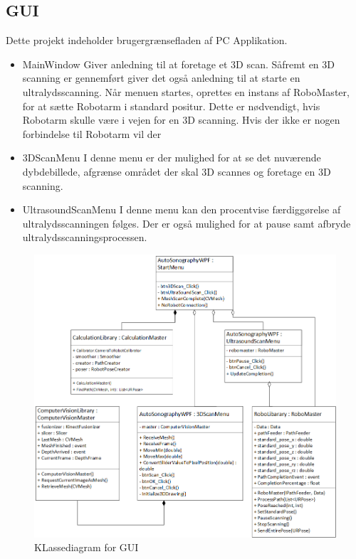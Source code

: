 \subsection{GUI}
Dette projekt indeholder brugergrænsefladen af PC Applikation.

\begin{itemize}
\item{MainWindow}
Giver anledning til at foretage et 3D scan. Såfremt en 3D scanning er gennemført giver det også anledning til at starte en ultralydsscanning.
Når menuen startes, oprettes en instans af RoboMaster, for at sætte Robotarm i standard positur. Dette er nødvendigt, hvis Robotarm skulle være i vejen for en 3D scanning.
Hvis der ikke er nogen forbindelse til Robotarm vil der 

\item{3DScanMenu}
I denne menu er der mulighed for at se det nuværende dybdebillede, afgrænse området der skal 3D scannes og foretage en 3D scanning.

\item{UltrasoundScanMenu}
I denne menu kan den procentvise færdiggørelse af ultralydsscanningen følges. Der er også mulighed for at pause samt afbryde ultralydsscanningsprocessen.
\end{itemize}

\begin{figure}[H]
    \centering
    \includegraphics[width=1\textwidth]{figurer/d/Design/Class/uml_class_gui}
    \caption{KLassediagram for GUI}
    \label{class_gui}
\end{figure}
\newpage

